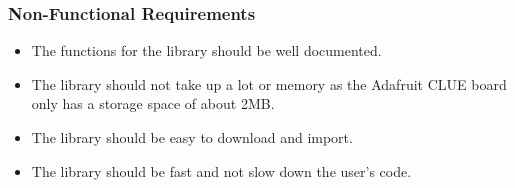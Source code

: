 \subsubsection{Non-Functional Requirements}

\begin{itemize}
    \item The functions for the library should be well documented.
    \item The library should not take up a lot or memory as the Adafruit CLUE board only has a storage space of about 2MB.
    \item The library should be easy to download and import.
    \item The library should be fast and not slow down the user's code.
\end{itemize}

